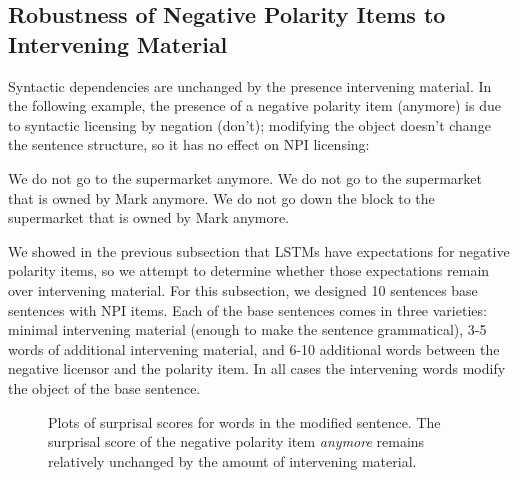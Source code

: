 \documentclass[11pt, round]{article}
\begin{document}
\subsection{Robustness of Negative Polarity Items to Intervening Material}
Syntactic dependencies are unchanged by the presence intervening material. In the following example, the presence of a negative polarity item (anymore) is due to syntactic licensing by negation (don't); modifying the object doesn't change the sentence structure, so it has no effect on NPI licensing:
\begin{exe}
\ex
\begin{xlist}
\ex We do not go to the supermarket anymore.
\ex We do not go to the supermarket that is owned by Mark anymore.
\ex We do not go down the block to the supermarket that is owned by Mark anymore. 
\end{xlist}
\end{exe}
We showed in the previous subsection that LSTMs have expectations for negative polarity items, so we attempt to determine whether those expectations remain over intervening material. For this subsection, we designed 10 sentences base sentences with NPI items. Each of the base sentences comes in three varieties: minimal intervening material (enough to make the sentence grammatical), 3-5 words of additional intervening material, and 6-10 additional words between the negative licensor and the polarity item. In all cases the intervening words modify the object of the base sentence.

\begin{figure}
    \centering
    \caption{Plots of surprisal scores for words in the modified sentence. The surprisal score of the negative polarity item \textit{anymore} remains relatively unchanged by the amount of intervening material.}
\end{figure}
\end{document}
